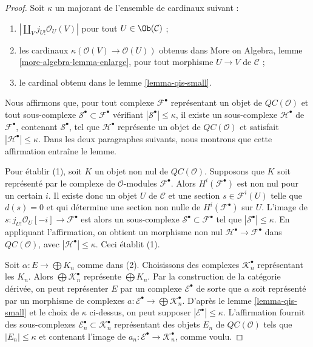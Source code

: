 \begin{proof}
Soit $\kappa$ un majorant de l'ensemble de cardinaux suivant :
\begin{enumerate}
\item $|\coprod_V j_{U!}\mathcal{O}_U(V)|$ pour tout
$U \in \Ob(\mathcal{C})$ ;
\item les cardinaux $\kappa(\mathcal{O}(V) \to \mathcal{O}(U))$ obtenus dans
More on Algebra, lemme \ref{more-algebra-lemma-enlarge}, pour tout morphisme
$U \to V$ de $\mathcal{C}$ ;
\item le cardinal obtenu dans le lemme \ref{lemma-qis-small}.
\end{enumerate}
Nous affirmons que, pour tout complexe $\mathcal{F}^\bullet$ représentant un
objet de $\mathit{QC}(\mathcal{O})$ et tout sous-complexe
$\mathcal{S}^\bullet \subset \mathcal{F}^\bullet$ vérifiant
$|\mathcal{S}^\bullet| \leq \kappa$, il existe un sous-complexe
$\mathcal{H}^\bullet$ de $\mathcal{F}^\bullet$, contenant
$\mathcal{S}^\bullet$, tel que $\mathcal{H}^\bullet$ représente un objet de
$\mathit{QC}(\mathcal{O})$ et satisfait
$|\mathcal{H}^\bullet| \leq \kappa$. Dans les deux paragraphes suivants,
nous montrons que cette affirmation entraîne le lemme.

\medskip\noindent
Pour établir (1), soit $K$ un objet non nul de
$\mathit{QC}(\mathcal{O})$. Supposons que $K$ soit représenté par le complexe
de $\mathcal{O}$-modules $\mathcal{F}^\bullet$. Alors
$H^i(\mathcal{F}^\bullet)$ est non nul pour un certain $i$. Il existe donc un
objet $U$ de $\mathcal{C}$ et une section
$s \in \mathcal{F}^i(U)$ telle que $d(s) = 0$ et qui détermine une section non
nulle de $H^i(\mathcal{F}^\bullet)$ sur $U$. L'image de
$s : j_{U!}\mathcal{O}_U[-i] \to \mathcal{F}^\bullet$ est alors un
sous-complexe $\mathcal{S}^\bullet \subset \mathcal{F}^\bullet$ tel que
$|\mathcal{S}^\bullet| \leq \kappa$. En appliquant l'affirmation, on obtient
un morphisme non nul $\mathcal{H}^\bullet \to \mathcal{F}^\bullet$ dans
$\mathit{QC}(\mathcal{O})$, avec
$|\mathcal{H}^\bullet| \leq \kappa$. Ceci établit (1).

\medskip\noindent
Soit $\alpha : E \to \bigoplus K_n$ comme dans (2). Choisissons des complexes
$\mathcal{K}_n^\bullet$ représentant les $K_n$. Alors
$\bigoplus \mathcal{K}_n^\bullet$ représente $\bigoplus K_n$. Par la
construction de la catégorie dérivée, on peut représenter $E$ par un complexe
$\mathcal{E}^\bullet$ de sorte que $\alpha$ soit représenté par un morphisme
de complexes
$a : \mathcal{E}^\bullet \to \bigoplus \mathcal{K}_n^\bullet$.
D'après le lemme \ref{lemma-qis-small} et le choix de $\kappa$ ci-dessus, on
peut supposer $|\mathcal{E}^\bullet| \leq \kappa$. L'affirmation fournit des
sous-complexes $\mathcal{E}_n^\bullet \subset \mathcal{K}_n^\bullet$
représentant des objets $E_n$ de $\mathit{QC}(\mathcal{O})$ tels que
$|E_n| \leq \kappa$ et contenant l'image de
$a_n : \mathcal{E}^\bullet \to \mathcal{K}_n^\bullet$, comme voulu.


\end{proof}

